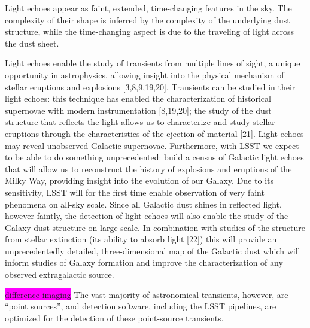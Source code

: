 \documentclass{proposalnsf}
\newcommand{\changeit}[1]{\colorbox{magenta}{#1}}
\begin{document}
Light echoes appear as faint, extended, time-changing features in the sky. The complexity of their shape is inferred by the complexity of the underlying dust structure, while the time-changing aspect is due to the traveling of light across the dust sheet.


Light echoes enable the study of transients from multiple lines of sight, a unique opportunity in astrophysics, allowing insight into the physical mechanism of stellar eruptions and explosions [3,8,9,19,20].  Transients can be studied in their light echoes: this technique has enabled the characterization of historical supernovae with modern instrumentation [8,19,20]; the study of the dust structure that reflects the light allows us to characterize and study stellar eruptions through the characteristics of the ejection of material [21].  Light echoes may reveal unobserved Galactic supernovae.  Furthermore, with LSST we expect to be able to do something unprecedented: build a census of Galactic light echoes that will allow us to reconstruct the history of explosions and eruptions of the Milky Way, providing insight into the evolution of our Galaxy.  Due to its sensitivity, LSST will for the first time enable observation of very faint phenomena on all-sky scale.  Since all Galactic dust shines in reflected light, however faintly, the detection of light echoes will also enable the study of the Galaxy dust structure on large scale.  In combination with studies of the structure from stellar extinction (its ability to absorb light [22]) this will provide an unprecedentedly detailed, three-dimensional map of the Galactic dust which will inform studies of Galaxy formation and improve the characterization of any observed extragalactic source. 


\changeit{difference imaging}
The vast majority of astronomical transients, however, are “point sources”, and detection software, including the LSST pipelines, are optimized for the detection of these point-source transients.
\end{document}
